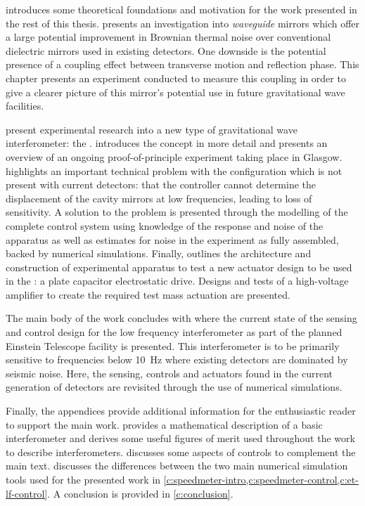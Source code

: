  introduces some theoretical foundations and motivation for the work presented in the rest of this thesis.  presents an investigation into \emph{waveguide} mirrors which offer a large potential improvement in Brownian thermal noise over conventional dielectric mirrors used in existing detectors. One downside is the potential presence of a coupling effect between transverse motion and reflection phase. This chapter presents an experiment conducted to measure this coupling in order to give a clearer picture of this mirror's potential use in future gravitational wave facilities.

 present experimental research into a new type of gravitational wave interferometer: the \SSM{}.  introduces the concept in more detail and presents an overview of an ongoing proof-of-principle experiment taking place in Glasgow.  highlights an important technical problem with the \SSM{} configuration which is not present with current detectors: that the controller cannot determine the displacement of the cavity mirrors at low frequencies, leading to loss of sensitivity. A solution to the problem is presented through the modelling of the complete control system using knowledge of the response and noise of the apparatus as well as estimates for noise in the experiment as fully assembled, backed by numerical simulations. Finally,  outlines the architecture and construction of experimental apparatus to test a new actuator design to be used in the \SSMEXPT{}: a plate capacitor electrostatic drive. Designs and tests of a high-voltage amplifier to create the required test mass actuation are presented.

The main body of the work concludes with  where the current state of the sensing and control design for the low frequency interferometer as part of the planned Einstein Telescope facility is presented. This interferometer is to be primarily sensitive to frequencies below \SI{10}{\hertz} where existing detectors are dominated by seismic noise. Here, the sensing, controls and actuators found in the current generation of detectors are revisited through the use of numerical simulations.

Finally, the appendices provide additional information for the enthusiastic reader to support the main work.  provides a mathematical description of a basic interferometer and derives some useful figures of merit used throughout the work to describe interferometers.  discusses some aspects of controls to complement the main text.  discusses the differences between the two main numerical simulation tools used for the presented work in \cref{c:speedmeter-intro,c:speedmeter-control,c:et-lf-control}. A conclusion is provided in \cref{c:conclusion}.